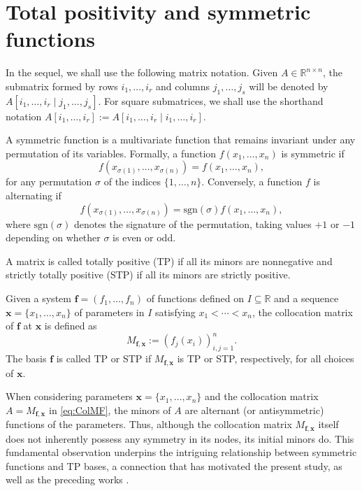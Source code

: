 \documentclass[smallextended]{svjour3}       %
\begin{document}
\section{Total positivity and symmetric functions}\label{sec:prelim}
 In the sequel, we shall use the following matrix notation. Given   \( A \in \mathbb{R}^{n \times n} \), the submatrix formed by rows \( i_1, \ldots, i_r \) and columns \( j_1, \ldots, j_s \) will be denoted by  
\(
A[i_1, \ldots, i_r \mid j_1, \ldots, j_s].
\)  
For square submatrices, we shall use the shorthand notation   \(A[i_1, \ldots, i_r] := A[i_1, \ldots, i_r \mid i_1, \ldots, i_r]\).

 A symmetric function is a multivariate function that remains invariant under any permutation of its variables. Formally, a function \( f(x_1, \ldots, x_n) \) is symmetric if  
\[
f(x_{\sigma(1)}, \ldots, x_{\sigma(n)}) = f(x_1, \ldots, x_n),
\]
for any permutation \( \sigma \) of the indices \( \{1, \ldots, n\} \). Conversely, a function \( f \) is alternating if  
\[
f(x_{\sigma(1)}, \ldots, x_{\sigma(n)}) = \text{sgn}(\sigma) f(x_1, \ldots, x_n),
\]
where \(\text{sgn}(\sigma)\) denotes the signature of the permutation, taking values \( +1 \) or \( -1 \) depending on whether \( \sigma \) is even or odd.  

A matrix is called totally positive (TP) if all its minors are nonnegative and strictly totally positive (STP) if all its minors are strictly positive.

Given a system \( \mathbf{f} = (f_1, \ldots, f_n) \) of functions defined on \( I \subseteq \mathbb{R} \) and a sequence   \( \mathbf{x} = \{ x_1 , \ldots, x_n \} \) of parameters in $I$ satisfying \( x_1 < \cdots < x_n \), the collocation matrix of \( \mathbf{f} \) at \( \mathbf{x} \) is defined as  
\begin{equation}\label{eq:ColMF}
M_{\mathbf{f} ,\mathbf{x}}  := \left( f_j(x_i) \right)_{i,j=1}^n.
\end{equation}
The basis \( \mathbf{f} \) is called TP or STP if \( M_{\mathbf{f} ,\mathbf{x}}  \) is TP or STP, respectively, for all choices of \( \mathbf{x} \).  

When considering parameters \(\mathbf{x} = \{ x_1, \ldots, x_n \} \) and  the collocation matrix \( A = M_{\mathbf{f},\mathbf{x}} \) in \eqref{eq:ColMF}, the minors of $A$  are alternant (or antisymmetric) functions of the parameters.  Thus, although the collocation matrix \( M_{\mathbf{f}, \mathbf{x}} \) itself does not inherently possess any symmetry in its nodes, its initial minors do. This fundamental observation underpins the intriguing relationship between symmetric functions and TP bases, a connection that has motivated the present study, as well as the preceding works \cite{DMR,DMR2,DMR3}. 
 
\end{document}
